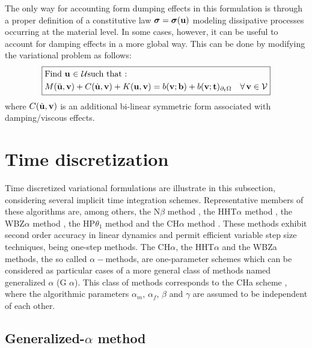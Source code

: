 The only way for accounting form dumping effects in this formulation
is through a proper definition of a constitutive law $\mbox{\boldmath${\sigma}$}=\mbox{\boldmath${\sigma}$}({\bf{u}})$
modeling dissipative processes occurring at the material level. In
some cases, however, it can be useful to account for damping effects
in a more global way. This can be done by modifying the variational
problem as follows:
\begin{equation}
\boxed{\begin{aligned} & \text{Find}~{{\bf{u}}}~{\in}~{\mathcal{U}} \text{such that : }\\
 & M(\ddot{{\bf{u}}},{\bf{v}})+C(\dot{{\bf{u}}},{\bf{v}})+K({\bf{u}},{\bf{v}})=b({\bf{v}};{\bf{b}})+b({\bf{v}};{\bf t})_{\partial_{t}\Omega}\quad\forall\,{\bf{v}}\in\mathcal{V}
\end{aligned}
}
\end{equation}
where $C(\dot{{\bf{u}}},{\bf{v}})$ is an additional bi-linear symmetric form
associated with damping/viscous effects.

\section{Time discretization}

Time discretized variational formulations are illustrate in this subsection,
considering several implicit time integration schemes. Representative
members of these algorithms are, among others, the N\textminus $\beta$
method \cite{newmark1959method}, the HHT\textminus $\alpha$ method \cite{hilber1977improved}, the WBZ\textminus $\alpha$ method \cite{wood1980alpha}, the HP\textminus $\theta_{1}$ method \cite{hoff1988development} and the CH\textminus $\alpha$ method \cite{chung1993time}. These methods exhibit second order accuracy
in linear dynamics and permit efficient variable step size techniques,
being one-step methods. The CH\textminus $\alpha$, the HHT\textminus $\alpha$
and the WBZ\textminus \textgreek{a} methods, the so called $\alpha-$methods,
are one-parameter schemes which can be considered as particular cases
of a more general class of methods named generalized \textminus{}
$\alpha$ (G \textminus{} $\alpha$). This class
of methods corresponds to the CH\textminus \textgreek{a} scheme \cite{chung1993time}, where the algorithmic parameters $\alpha_{m}$,
$\alpha_{f}$, $\beta$ and $\gamma$ are assumed to be independent
of each other.

\subsection{Generalized-\texorpdfstring{$\alpha$}{a} method}

